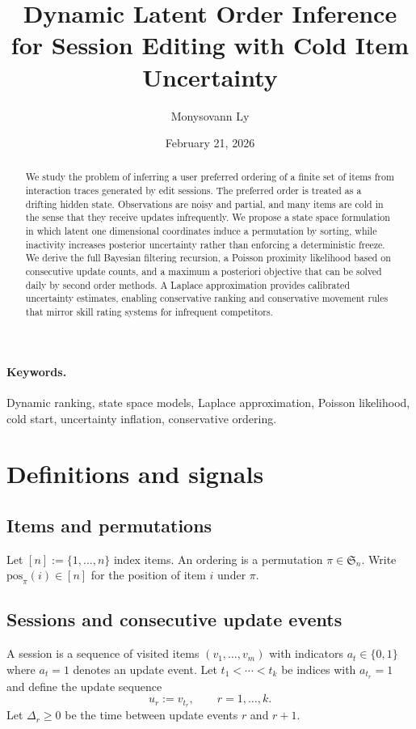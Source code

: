 \documentclass[11pt]{article}
\title{Dynamic Latent Order Inference for Session Editing with Cold Item Uncertainty}
\author{Monysovann Ly}
\date{February 21, 2026}
\begin{document}
\maketitle

\begin{abstract}
We study the problem of inferring a user preferred ordering of a finite set of items from interaction traces generated by edit sessions.
The preferred order is treated as a drifting hidden state.
Observations are noisy and partial, and many items are cold in the sense that they receive updates infrequently.
We propose a state space formulation in which latent one dimensional coordinates induce a permutation by sorting, while inactivity increases posterior uncertainty rather than enforcing a deterministic freeze.
We derive the full Bayesian filtering recursion, a Poisson proximity likelihood based on consecutive update counts, and a maximum a posteriori objective that can be solved daily by second order methods.
A Laplace approximation provides calibrated uncertainty estimates, enabling conservative ranking and conservative movement rules that mirror skill rating systems for infrequent competitors.
\end{abstract}

\paragraph{Keywords.}
Dynamic ranking, state space models, Laplace approximation, Poisson likelihood, cold start, uncertainty inflation, conservative ordering.

\tableofcontents
\bigskip

\section{Definitions and signals}

\subsection{Items and permutations}
Let $[n] := \{1,\dots,n\}$ index items.
An ordering is a permutation $\pi \in \mathfrak S_n$.
Write $\mathrm{pos}_{\pi}(i)\in[n]$ for the position of item $i$ under $\pi$.

\subsection{Sessions and consecutive update events}
A session is a sequence of visited items $(v_1,\dots,v_m)$ with indicators $a_t\in\{0,1\}$ where $a_t=1$ denotes an update event.
Let $t_1<\cdots<t_k$ be indices with $a_{t_r}=1$ and define the update sequence
\[
u_r := v_{t_r},\qquad r=1,\dots,k.
\]
Let $\Delta_r\ge 0$ be the time between update events $r$ and $r+1$.
\end{document}
